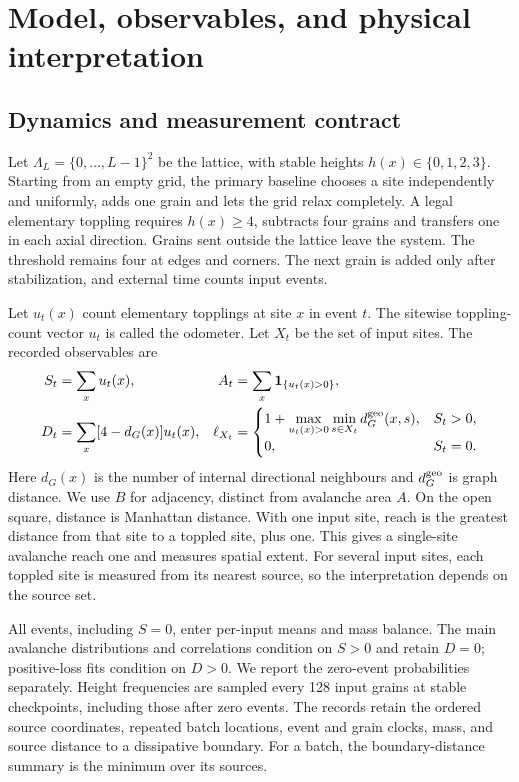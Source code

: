 \chapter{Model, observables, and physical interpretation}\label{sec:model}
\section{Dynamics and measurement contract}\label{sec:observables}
Let $\Lambda_L=\{0,\ldots,L-1\}^2$ be the lattice, with stable heights $h(x)\in\{0,1,2,3\}$. Starting from an empty grid, the primary baseline chooses a site independently and uniformly, adds one grain and lets the grid relax completely. A legal elementary toppling requires $h(x)\geq4$, subtracts four grains and transfers one in each axial direction. Grains sent outside the lattice leave the system. The threshold remains four at edges and corners. The next grain is added only after stabilization, and external time counts input events.

Let $u_t(x)$ count elementary topplings at site $x$ in event $t$. The sitewise toppling-count vector $u_t$ is called the odometer. Let $X_t$ be the set of input sites. The recorded observables are
\begin{align}
 S_t&=\sum_xu_t(x), & A_t&=\sum_x\mathbf 1_{\{u_t(x)>0\}},\\
 D_t&=\sum_x[4-d_G(x)]u_t(x),&
 \ell_{X_t}&=\begin{cases}1+\displaystyle\max_{u_t(x)>0}\min_{s\in X_t}d_G^{\rm geo}(x,s),&S_t>0,\\0,&S_t=0.\end{cases}
 \label{eq:observables}
\end{align}
Here $d_G(x)$ is the number of internal directional neighbours and $d_G^{\rm geo}$ is graph distance. We use $B$ for adjacency, distinct from avalanche area $A$. On the open square, distance is Manhattan distance. With one input site, reach is the greatest distance from that site to a toppled site, plus one. This gives a single-site avalanche reach one and measures spatial extent. For several input sites, each toppled site is measured from its nearest source, so the interpretation depends on the source set.

All events, including $S=0$, enter per-input means and mass balance. The main avalanche distributions and correlations condition on $S>0$ and retain $D=0$; positive-loss fits condition on $D>0$. We report the zero-event probabilities separately. Height frequencies are sampled every 128 input grains at stable checkpoints, including those after zero events. The records retain the ordered source coordinates, repeated batch locations, event and grain clocks, mass, and source distance to a dissipative boundary. For a batch, the boundary-distance summary is the minimum over its sources.

